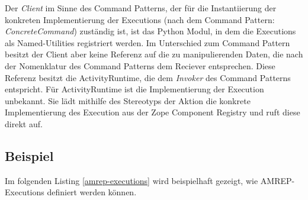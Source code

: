 
Der \emph{Client} im Sinne des Command Patterns, der für die Instantiierung der konkreten Implementierung der Executions (nach dem Command Pattern: \emph{ConcreteCommand}) zuständig ist, ist das Python Modul, in dem die Executions als Named-Utilities registriert werden. Im Unterschied zum Command Pattern besitzt der Client aber keine Referenz auf die zu manipulierenden Daten, die nach der Nomenklatur des Command Patterns dem Reciever entsprechen. Diese Referenz besitzt die ActivityRuntime, die dem \emph{Invoker} des Command Patterns entspricht. Für ActivityRuntime ist die Implementierung der Execution unbekannt. Sie lädt mithilfe des Stereotyps der Aktion die konkrete Implementierung des Execution aus der Zope Component Registry und ruft diese direkt auf.


\subsection{Beispiel}

Im folgenden Listing \ref{amrep-executions} wird beispielhaft gezeigt, wie AMREP-Executions definiert werden können.


